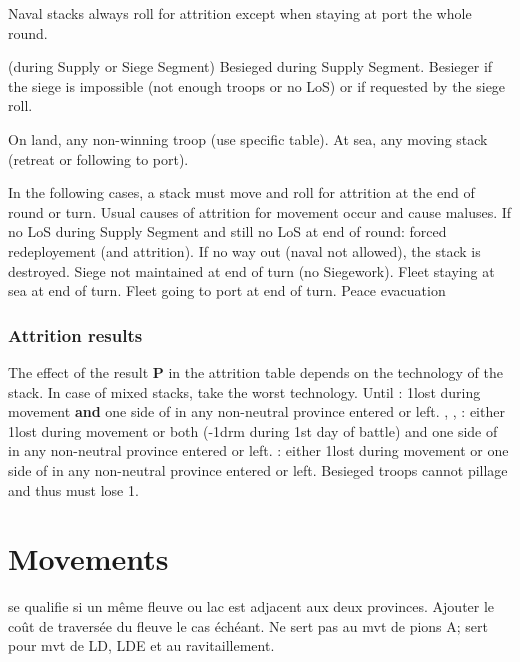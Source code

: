  Naval stacks always roll for attrition except when
staying at port the whole round.

 (during Supply or Siege Segment)
\bparag Besieged during Supply Segment.
\bparag Besieger if the siege is impossible (not enough troops or no LoS) or
if requested by the siege roll.

\bparag On land, any non-winning troop (use specific table).
\bparag At sea, any moving stack (retreat or following to port).

 In the following cases, a stack
must move and roll for attrition at the end of round or turn. Usual causes of
attrition for movement occur and cause maluses.
\bparag If no LoS during Supply Segment and still no LoS at end of round:
forced redeployement (and attrition). If no way out (naval not allowed), the
stack is destroyed.
\bparag Siege not maintained at end of turn (no Siegework\faceplus).
\bparag Fleet staying at sea at end of turn.
\bparag Fleet going to port at end of turn.
\bparag Peace evacuation

\subsubsection{Attrition results}
\aparag The effect of the result \textbf{P} in the attrition table depends on
the technology of the stack. In case of mixed stacks, take the worst technology.
\bparag Until \TARQ: 1\LD lost during movement \textbf{and} one side of
\PILLAGE in any non-neutral province entered or left.
\bparag \TMUS, \TBAR, \TMAN: either 1\LD lost during movement or both
 (-1drm during 1st day of battle) and one side of \PILLAGE in
any non-neutral province entered or left.
\bparag \TL: either 1\LD lost during movement or one side of \PILLAGE in any
non-neutral province entered or left.
\bparag Besieged troops cannot pillage and thus must lose 1\LD.

\section{Movements}
se qualifie si un même fleuve ou lac est adjacent
aux deux provinces. Ajouter le coût de traversée du
fleuve le cas échéant.
\bparag Ne sert pas au mvt de pions A; sert pour mvt de LD, LDE
et au ravitaillement.

